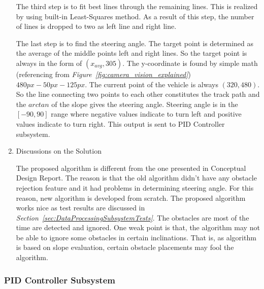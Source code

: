 \documentclass[a4paper,12pt]{article}
\begin{document}
\begin{enumerate}
	The third step is to fit best lines through the remaining lines. This is realized by using built-in Least-Squares method. As a result of this step, the number of lines is dropped to two as left line and right line.
	
	The last step is to find the steering angle. The target point is determined as the average of the middle points left and right lines. So the target point is always in the form of $(x_{avg}, 305)$. The y-coordinate is found by simple math (referencing from \textit{Figure~\ref{fig:camera_vision_explained}}) $480px-50px-125px$. The current point of the vehicle is always $(320,480)$. So the line connecting two points to each other constitutes the track path and the $arctan$ of the slope gives the steering angle. Steering angle is in the $[-90,90]$ range where negative values indicate to turn left and positive values indicate to turn right. This output is sent to PID Controller subsystem.
		\newpage
		\item {Discussions on the Solution}
		
	The proposed algorithm is different from the one presented in Conceptual Design Report. The reason is that the old algorithm didn't have any obstacle rejection	feature and it had problems in determining steering angle. For this reason, new algorithm is developed from scratch. The proposed algorithm works nice as test results are discussed in \textit{Section~\ref{sec:DataProcessingSubsystemTests}}. The obstacles are most of the time are detected and ignored. One weak point is that, the algorithm may not be able to ignore some obstacles in certain inclinations. That is, as algorithm is based on slope evaluation, certain obstacle placements may fool the algorithm.
			
		\end{enumerate}
	
		
		
		\subsubsection{PID Controller Subsystem}\label{sect:ControllerSubsystem}
		
\end{document}
